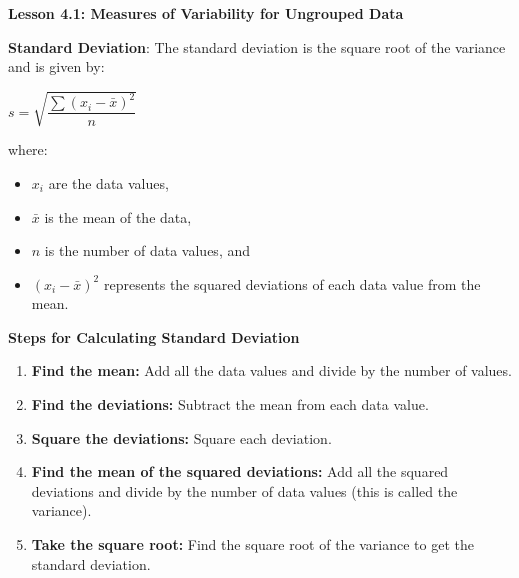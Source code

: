 \begin{center}
\textbf{Lesson 4.1: Measures of Variability for Ungrouped Data}
\end{center}

\vspace*{1ex}

\noindent\textbf{Standard Deviation}: The standard deviation is the square root of the variance and is given by:

{\centering $ s = \sqrt{\dfrac{\sum (x_i - \bar{x})^2}{n}} $\par}

where:
\begin{itemize}
    \item $x_i$ are the data values,
    \item $\bar{x}$ is the mean of the data,
    \item $n$ is the number of data values, and
    \item $(x_i - \bar{x})^2$ represents the squared deviations of each data value from the mean.
\end{itemize}

\noindent\textbf{Steps for Calculating Standard Deviation}

\begin{enumerate}
    \item \textbf{Find the mean:} Add all the data values and divide by the number of values.
    \item \textbf{Find the deviations:} Subtract the mean from each data value.
    \item \textbf{Square the deviations:} Square each deviation.
    \item \textbf{Find the mean of the squared deviations:} Add all the squared deviations and divide by the number of data values (this is called the variance).
    \item \textbf{Take the square root:} Find the square root of the variance to get the standard deviation.
\end{enumerate}


